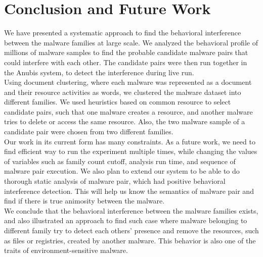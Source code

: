 \chapter{Conclusion and Future Work}\label{chapter:conclusion_and_future_work}
We have presented a systematic approach to find the behavioral interference between the malware families at large scale.
We analyzed the behavioral profile of millions of malware samples to find the probable candidate malware pairs that could interfere with each other.
The candidate pairs were then run together in the Anubis system, to detect the interference during live run.\\

Using document clustering, where each malware was represented as a document and their resource activities as words, we clustered the malware dataset into different families.
We used heuristics based on common resource to select candidate pairs, such that one malware creates a resource, and another malware tries to delete or access the same resource.
Also, the two malware sample of a candidate pair were chosen from two different families.
\\

Our work in its current form has many constraints.
As a future work, we need to find efficient way to run the experiment multiple times, while changing the values of variables such as family count cutoff, analysis run time, and sequence of malware pair execution.
We also plan to extend our system to be able to do thorough static analysis of malware pair, which had positive behavioral interference detection.
This will help us know the semantics of malware pair and find if there is true animosity between the malware.
\\

We conclude that the behavioral interference between the malware families exists, and also illustrated an approach to find such case where malware belonging to different family try to detect each others' presence and remove the resources, such as files or registries, created by another malware.
This behavior is also one of the traits of environment-sensitive malware.



